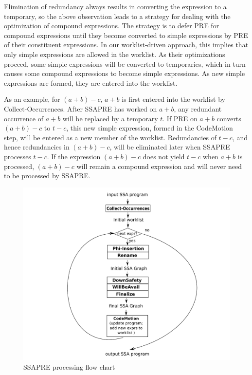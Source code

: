 Elimination of redundancy always results in converting the expression to a
temporary, so the above observation leads to a strategy for dealing with
the optimization of compound expressions.  The strategy is to defer PRE for
compound expressions until they become converted to simple expressions by
PRE of their constituent expressions.  In our worklist-driven approach,
this implies that only simple expressions are allowed in the worklist.
As their optimizations proceed, some simple expressions will be converted to
temporaries, which in turn causes some compound expressions to become
simple expressions.  As new simple expressions are formed, they are entered
into the worklist.

As an example, for $(a+b)-c$, $a+b$ is first entered into the worklist by
Collect-Occurrences.  After SSAPRE has worked on $a+b$, any redundant occurrence
of $a+b$ will be replaced by a temporary $t$.  If PRE on $a+b$ converts
$(a+b)-c$ to $t-c$, this new simple expression, formed in the CodeMotion step,
will be entered as a new member of the worklist.  Redundancies of $t-c$, and
hence redundancies in $(a+b)-c$, will be eliminated later when SSAPRE
processes $t-c$.  If the expression $(a+b)-c$ does not yield $t-c$ when $a+b$
is processed, $(a+b)-c$ will remain a compound expression and will never need
to be processed by SSAPRE.

\begin{figure}
\centering
\includegraphics[scale=0.45]{fig-ssapre-flow.pdf}
\caption{SSAPRE processing flow chart}
\label{fig: ssapre-flow}
\end{figure}

